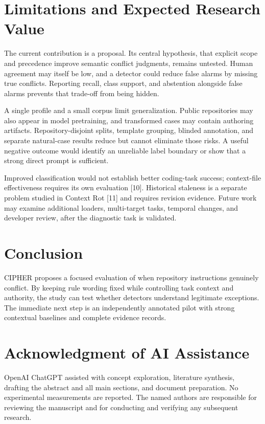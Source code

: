 \documentclass[10pt,conference]{IEEEtran}
\begin{document}
\section{Limitations and Expected Research Value}

The current contribution is a proposal. Its central hypothesis, that explicit scope and precedence improve semantic conflict judgments, remains untested. Human agreement may itself be low, and a detector could reduce false alarms by missing true conflicts. Reporting recall, class support, and abstention alongside false alarms prevents that trade-off from being hidden.


A single profile and a small corpus limit generalization. Public repositories may also appear in model pretraining, and transformed cases may contain authoring artifacts. Repository-disjoint splits, template grouping, blinded annotation, and separate natural-case results reduce but cannot eliminate those risks. A useful negative outcome would identify an unreliable label boundary or show that a strong direct prompt is sufficient.


Improved classification would not establish better coding-task success; context-file effectiveness requires its own evaluation [10]. Historical staleness is a separate problem studied in Context Rot [11] and requires revision evidence. Future work may examine additional loaders, multi-target tasks, temporal changes, and developer review, after the diagnostic task is validated.


\section{Conclusion}

CIPHER proposes a focused evaluation of when repository instructions genuinely conflict. By keeping rule wording fixed while controlling task context and authority, the study can test whether detectors understand legitimate exceptions. The immediate next step is an independently annotated pilot with strong contextual baselines and complete evidence records.


\section*{Acknowledgment of AI Assistance}
OpenAI ChatGPT assisted with concept exploration, literature synthesis, drafting the abstract and all main sections, and document preparation. No experimental measurements are reported. The named authors are responsible for reviewing the manuscript and for conducting and verifying any subsequent research.
\end{document}
